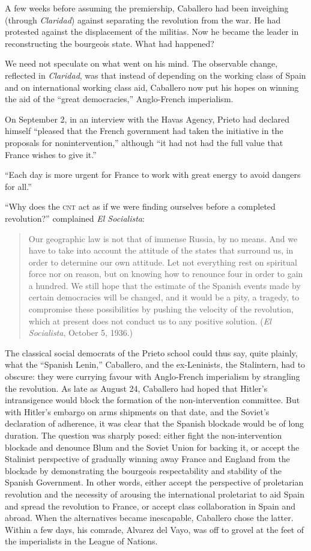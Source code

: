 A few weeks before assuming the premiership, Caballero had been inveighing (through \emph{Claridad}) against separating the revolution from the war. He had protested against the displacement of the militias. Now he became the leader in reconstructing the bourgeois state. What had happened?

We need not speculate on what went on his mind. The observable change, reflected in \emph{Claridad}, was that instead of depending on the working class of Spain and on international working class aid, Caballero now put his hopes on winning the aid of the ``great democracies,'' Anglo-French imperialism.

On September 2, in an interview with the Havas Agency, Prieto had declared himself ``pleased that the French government had taken the initiative in the proposals for nonintervention,'' although ``it had not had the full value that France wishes to give it.''

``Each day is more urgent for France to work with great energy to avoid dangers for all.''

``Why does the \textsc{cnt} act as if we were finding ourselves before a completed revolution?'' complained \emph{El Socialista}:
\begin{quote}
  Our geographic law is not that of immense Russia, by no means. And we have to take into account the attitude of the states that surround us, in order to determine our own attitude. Let not everything rest on spiritual force nor on reason, but on knowing how to renounce four in order to gain a hundred. We still hope that the estimate of the Spanish events made by certain democracies will be changed, and it would be a pity, a tragedy, to compromise these possibilities by pushing the velocity of the revolution, which at present does not conduct us to any positive solution. (\emph{El Socialista}, October 5, 1936.)
\end{quote}

The classical social democrats of the Prieto school could thus say, quite plainly, what the ``Spanish Lenin,'' Caballero, and the ex-Leninists, the Stalintern, had to obscure: they were currying favour with Anglo-French imperialism by strangling the revolution. As late as August 24, Caballero had hoped that Hitler’s intransigence would block the formation of the non-intervention committee. But with Hitler’s embargo on arms shipments on that date, and the Soviet’s declaration of adherence, it was clear that the Spanish blockade would be of long duration. The question was sharply posed: either fight the non-intervention blockade and denounce Blum and the Soviet Union for backing it, or accept the Stalinist perspective of gradually winning away France and England from the blockade by demonstrating the bourgeois respectability and stability of the Spanish Government. In other words, either accept the perspective of proletarian revolution and the necessity of arousing the international proletariat to aid Spain and spread the revolution to France, or accept class collaboration in Spain and abroad. When the alternatives became inescapable, Caballero chose the latter. Within a few days, his comrade, Alvarez del Vayo, was off to grovel at the feet of the imperialists in the League of Nations.

